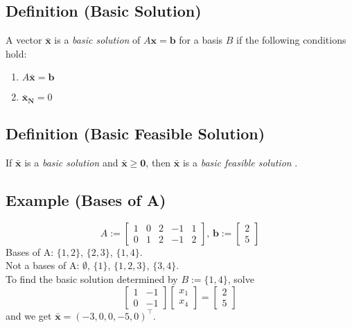 \begin{defbox}
    \subsection{Definition (Basic Solution)}
    A vector $\bm{\bar{x}}$ is a \emph{basic solution} of $ A \bm{x}=\bm{b} $
    for a basis $ B $ if the following conditions hold:
    \begin{enumerate}[(1)]
        \item $A \bm{\bar{x}}=\bm{b}$
        \item $\bm{\bar{x}_N}=0$
    \end{enumerate}
\end{defbox}

\begin{defbox}
    \subsection{Definition (Basic Feasible Solution)}
    If $\bm{\bar{x}}$ is a \emph{basic solution} and $\bm{\bar{x}}\ge \bm{0}$,
    then $\bm{\bar{x}}$ is a \emph{basic feasible solution} .
\end{defbox}

\subsection{Example (Bases of A)}
\[A:=
\begin{bmatrix}
    1 & 0 & 2 & -1 & 1\\
    0 & 1 & 2 & -1 & 2
\end{bmatrix}
\text{, }
\bm{b}:=
\begin{bmatrix}
    2\\
    5
\end{bmatrix}
\]
Bases of A: $\{1,2\}$, $\{2,3\}$, $\{1,4\}$.\\
Not a bases of A: $\emptyset$, $\{1\}$, $\{1,2,3\}$, $\{3,4\}$.\\
To find the basic solution determined by $B:=\{1,4\}$, solve
\[
\begin{bmatrix}
    1 & -1\\
    0 & -1
\end{bmatrix}
\begin{bmatrix}
    x_1\\
    x_4
\end{bmatrix}
=
\begin{bmatrix}
    2\\
    5
\end{bmatrix}
\]
and we get $\bm{\bar{x}}=(-3,0,0,-5,0)^\top $.